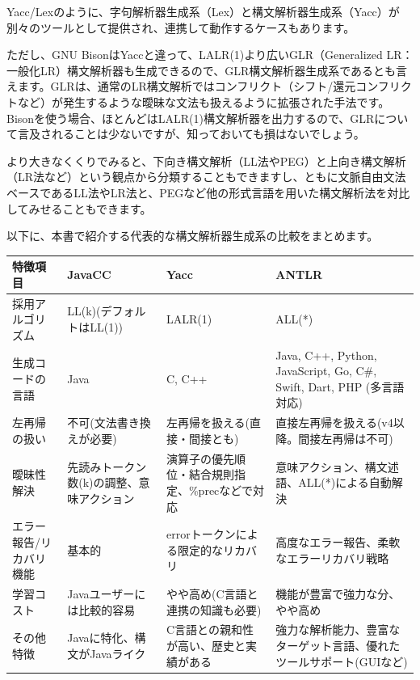 Yacc/Lexのように、字句解析器生成系（Lex）と構文解析器生成系（Yacc）が別々のツールとして提供され、連携して動作するケースもあります。

ただし、GNU BisonはYaccと違って、LALR(1)より広いGLR（Generalized
LR：一般化LR）構文解析器も生成できるので、GLR構文解析器生成系であるとも言えます。GLRは、通常のLR構文解析ではコンフリクト（シフト/還元コンフリクトなど）が発生するような曖昧な文法も扱えるように拡張された手法です。Bisonを使う場合、ほとんどはLALR(1)構文解析器を出力するので、GLRについて言及されることは少ないですが、知っておいても損はないでしょう。

より大きなくくりでみると、下向き構文解析（LL法やPEG）と上向き構文解析（LR法など）という観点から分類することもできますし、ともに文脈自由文法ベースであるLL法やLR法と、PEGなど他の形式言語を用いた構文解析法を対比してみせることもできます。

以下に、本書で紹介する代表的な構文解析器生成系の比較をまとめます。

\begin{table}[htb]
  \small
  \begin{center}
    \begin{tabular}{p{3cm}p{3cm}p{3cm}p{3cm}}\hline
      特徴項目 & JavaCC & Yacc & ANTLR\\ \hline
      採用アルゴリズム & LL(k)(デフォルトはLL(1)) & LALR(1) & ALL(*)\\ \hline
      生成コードの言語 & Java & C, C++ & Java, C++, Python, JavaScript, Go, C\#, Swift, Dart, PHP (多言語対応)\\ \hline
      左再帰の扱い & 不可(文法書き換えが必要) & 左再帰を扱える(直接・間接とも) & 直接左再帰を扱える(v4以降。間接左再帰は不可)\\ \hline
      曖昧性解決 & 先読みトークン数(k)の調整、意味アクション & 演算子の優先順位・結合規則指定、\%precなどで対応	 & 意味アクション、構文述語、ALL(*)による自動解決\\ \hline
      エラー報告/リカバリ機能 & 基本的 & errorトークンによる限定的なリカバリ & 高度なエラー報告、柔軟なエラーリカバリ戦略\\ \hline
      学習コスト & Javaユーザーには比較的容易 & やや高め(C言語と連携の知識も必要) & 機能が豊富で強力な分、やや高め\\ \hline
      その他特徴 & Javaに特化、構文がJavaライク & C言語との親和性が高い、歴史と実績がある & 強力な解析能力、豊富なターゲット言語、優れたツールサポート(GUIなど)\\ \hline
    \end{tabular}
  \end{center}
\end{table}

